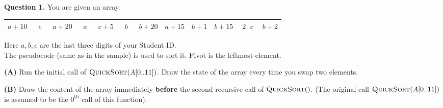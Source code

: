 \documentclass[a4paper,12pt]{article}
\begin{document}
\vspace{20pt}
{\bf Question 1.} 
You are given an array:

\vspace{5pt}
\begin{tabular}{|c|c|c|c|c|c|c|c|c|c|c|c|} \hline
$a+10$ & $\;\;c\;\;$ & $a+20$ & $\;\;a\;\;$ & $c+5$ & $\;\;b\;\;$ & $b+20$ & $a+15$ & $b+1$ & $b+15$ & $\;2\cdot c\;$ & $b+2$ \\ \hline
\end{tabular}

\vspace{5pt}
Here $a,b,c$ are the last three digits of your Student ID.\\
The pseudocode (same as in the sample) is used to sort it. Pivot is the leftmost element.

\vspace{5pt}
{\bf (A)} Run the initial call of $\text{\textsc{QuickSort}}(A[0..11])$.
Draw the state of the array every time you swap two 
elements. 

\vspace{5pt}
{\bf (B)}
Draw the content of the array immediately {\bf before} the second recursive 
call of $\text{\textsc{QuickSort}}()$.
(The original call $\text{\textsc{QuickSort}}(A[0..11])$ is assumed to be the
$0^{\text{th}}$ call of this function). 
\end{document}
